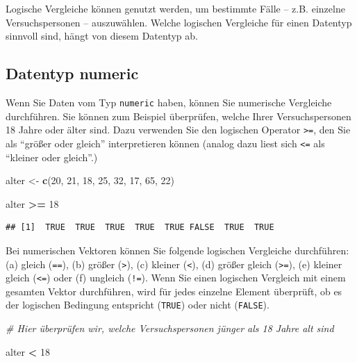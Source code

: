 \documentclass[
  ngerman,
]{book}
\newenvironment{Shaded}{\begin{snugshade}}{\end{snugshade}}
\newcommand{\CommentTok}[1]{\textcolor[rgb]{0.56,0.35,0.01}{\textit{#1}}}
\newcommand{\DecValTok}[1]{\textcolor[rgb]{0.00,0.00,0.81}{#1}}
\newcommand{\FunctionTok}[1]{\textcolor[rgb]{0.13,0.29,0.53}{\textbf{#1}}}
\newcommand{\NormalTok}[1]{#1}
\newcommand{\OtherTok}[1]{\textcolor[rgb]{0.56,0.35,0.01}{#1}}
\newcommand{\SpecialCharTok}[1]{\textcolor[rgb]{0.81,0.36,0.00}{\textbf{#1}}}
\begin{document}
Logische Vergleiche können genutzt werden, um bestimmte Fälle -- z.B. einzelne Versuchspersonen -- auszuwählen. Welche logischen Vergleiche für einen Datentyp sinnvoll sind, hängt von diesem Datentyp ab.

\subsection{Datentyp numeric}\label{datentyp-numeric-1}

Wenn Sie Daten vom Typ \texttt{numeric} haben, können Sie numerische Vergleiche durchführen. Sie können zum Beispiel überprüfen, welche Ihrer Versuchspersonen 18 Jahre oder älter sind. Dazu verwenden Sie den logischen Operator \texttt{\textgreater{}=}, den Sie als ``größer oder gleich'' interpretieren können (analog dazu liest sich \texttt{\textless{}=} als ``kleiner oder gleich''.)

\begin{Shaded}
\begin{Highlighting}[]
\NormalTok{alter }\OtherTok{\textless{}{-}} \FunctionTok{c}\NormalTok{(}\DecValTok{20}\NormalTok{, }\DecValTok{21}\NormalTok{, }\DecValTok{18}\NormalTok{, }\DecValTok{25}\NormalTok{, }\DecValTok{32}\NormalTok{, }\DecValTok{17}\NormalTok{, }\DecValTok{65}\NormalTok{, }\DecValTok{22}\NormalTok{)}

\NormalTok{alter }\SpecialCharTok{\textgreater{}=} \DecValTok{18}
\end{Highlighting}
\end{Shaded}

\begin{verbatim}
## [1]  TRUE  TRUE  TRUE  TRUE  TRUE FALSE  TRUE  TRUE
\end{verbatim}

Bei numerischen Vektoren können Sie folgende logischen Vergleiche durchführen: (a) gleich (\texttt{==}), (b) größer (\texttt{\textgreater{}}), (c) kleiner (\texttt{\textless{}}), (d) größer gleich (\texttt{\textgreater{}=}), (e) kleiner gleich (\texttt{\textless{}=}) oder (f) ungleich (\texttt{!=}). Wenn Sie einen logischen Vergleich mit einem gesamten Vektor durchführen, wird für jedes einzelne Element überprüft, ob es der logischen Bedingung entspricht (\texttt{TRUE}) oder nicht (\texttt{FALSE}).

\begin{Shaded}
\begin{Highlighting}[]
\CommentTok{\# Hier überprüfen wir, welche Versuchspersonen jünger als 18 Jahre alt sind}

\NormalTok{alter }\SpecialCharTok{\textless{}} \DecValTok{18}
\end{Highlighting}
\end{Shaded}
\end{document}
